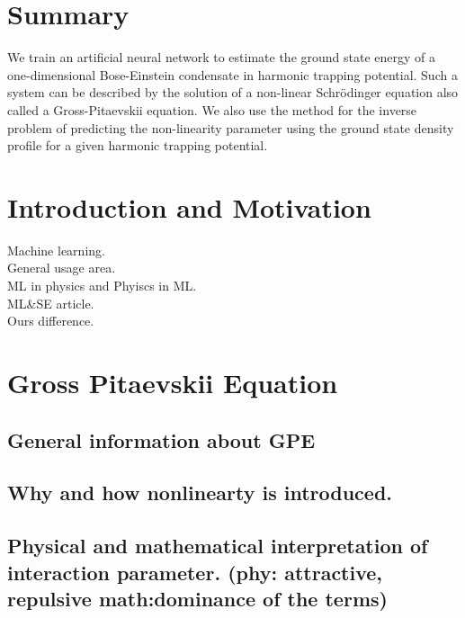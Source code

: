 \documentclass[a4paper,times,hidelinks,12pt]{article}
\begin{document}
\setcounter{page}{1}

\section*{Summary}

We train an artificial neural network to estimate the ground state energy
of a one-dimensional Bose-Einstein condensate in harmonic trapping potential.
Such a system can be described by the solution of a non-linear Schr{\"o}dinger equation also called a Gross-Pitaevskii equation. We also use the method for the inverse problem of predicting the non-linearity parameter using the ground
state density profile for a given harmonic trapping potential.

\newpage
\tableofcontents

\newpage

\section{Introduction and Motivation}
\label{sec:Intro}
\noindent Machine learning.\\
General usage area.\\
ML in physics and Phyiscs in ML.\\
ML\&SE article.\\
Ours difference.\\

\section{Gross Pitaevskii Equation}
\subsection{General information about GPE}
\subsection{Why and how nonlinearty is introduced.}
\subsection{Physical and mathematical interpretation of interaction parameter. (phy: attractive, repulsive  math:dominance of the terms)}
\end{document}
